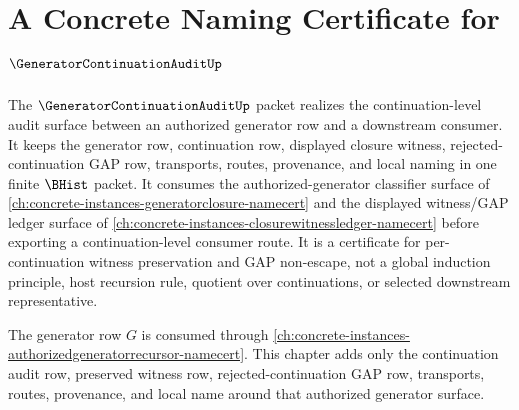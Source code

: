 \chapter{A Concrete Naming Certificate for $\GeneratorContinuationAuditUp$}
\label{ch:concrete-instances-generator-continuation-audit-namecert}

The $\GeneratorContinuationAuditUp$ packet realizes the continuation-level audit surface between an authorized generator row and a downstream consumer. It keeps the generator row, continuation row, displayed closure witness, rejected-continuation GAP row, transports, routes, provenance, and local naming in one finite $\BHist$ packet. It consumes the authorized-generator classifier surface of \autoref{ch:concrete-instances-generatorclosure-namecert} and the displayed witness/GAP ledger surface of \autoref{ch:concrete-instances-closurewitnessledger-namecert} before exporting a continuation-level consumer route. It is a certificate for per-continuation witness preservation and GAP non-escape, not a global induction principle, host recursion rule, quotient over continuations, or selected downstream representative.

The generator row $G$ is consumed through \autoref{ch:concrete-instances-authorizedgeneratorrecursor-namecert}. This chapter adds only the continuation audit row, preserved witness row, rejected-continuation GAP row, transports, routes, provenance, and local name around that authorized generator surface.

